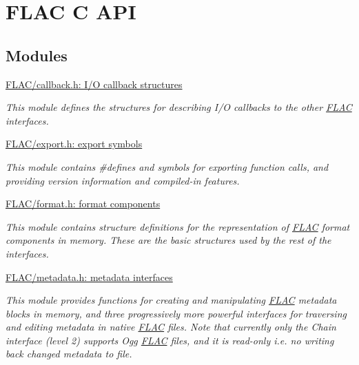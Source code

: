 \hypertarget{group__flac}{}\section{F\+L\+AC C A\+PI}
\label{group__flac}
\subsection*{Modules}
\begin{DoxyCompactItemize}
\item 
\hyperlink{group__flac__callbacks}{F\+L\+A\+C/callback.\+h\+: I/\+O callback structures}
\begin{DoxyCompactList}\small\item\em This module defines the structures for describing I/O callbacks to the other \hyperlink{namespace_f_l_a_c}{F\+L\+AC} interfaces. \end{DoxyCompactList}\item 
\hyperlink{group__flac__export}{F\+L\+A\+C/export.\+h\+: export symbols}
\begin{DoxyCompactList}\small\item\em This module contains \#defines and symbols for exporting function calls, and providing version information and compiled-\/in features. \end{DoxyCompactList}\item 
\hyperlink{group__flac__format}{F\+L\+A\+C/format.\+h\+: format components}
\begin{DoxyCompactList}\small\item\em This module contains structure definitions for the representation of \hyperlink{namespace_f_l_a_c}{F\+L\+AC} format components in memory. These are the basic structures used by the rest of the interfaces. \end{DoxyCompactList}\item 
\hyperlink{group__flac__metadata}{F\+L\+A\+C/metadata.\+h\+: metadata interfaces}
\begin{DoxyCompactList}\small\item\em This module provides functions for creating and manipulating \hyperlink{namespace_f_l_a_c}{F\+L\+AC} metadata blocks in memory, and three progressively more powerful interfaces for traversing and editing metadata in native \hyperlink{namespace_f_l_a_c}{F\+L\+AC} files. Note that currently only the Chain interface (level 2) supports Ogg \hyperlink{namespace_f_l_a_c}{F\+L\+AC} files, and it is read-\/only i.\+e. no writing back changed metadata to file. \end{DoxyCompactList}\item 

\end{DoxyCompactItemize}
